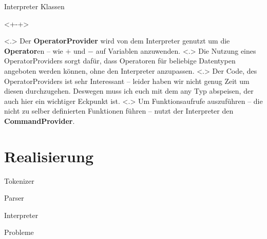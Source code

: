 \begin{frame}{Interpreter Klassen}
    \begin{uncoverenv}<+-+>%
          \note[item]<.>{
            Der \textbf{OperatorProvider} wird von dem Interpreter genutzt um die \textbf{Operator}en -- wie $+$ und $-$ auf Variablen anzuwenden.
          }
          \note[item]<.>{
            Die Nutzung eines OperatorProviders sorgt dafür, dass Operatoren für beliebige Datentypen angeboten werden können, ohne den Interpreter anzupassen.
          }
          \note[item]<.>{
            Der Code, des OperatorProviders ist sehr Interessant -- leider haben wir nicht genug Zeit um diesen durchzugehen. Deswegen muss ich euch mit dem any Typ abspeisen, der auch hier ein wichtiger Eckpunkt ist.
          }
          \note[item]<.>{
            Um Funktionsaufrufe auszuführen -- die nicht zu selber definierten Funktionen führen -- nutzt der Interpreter den \textbf{CommandProvider}.
          }
    \end{uncoverenv}
  \end{frame}

\section{Realisierung}

  \begin{frame}{Tokenizer}
  \end{frame}
  \begin{frame}{Parser} %
  \end{frame}
  \begin{frame}{Interpreter}
  \end{frame}
  \begin{frame}{Probleme} %
  \end{frame}

